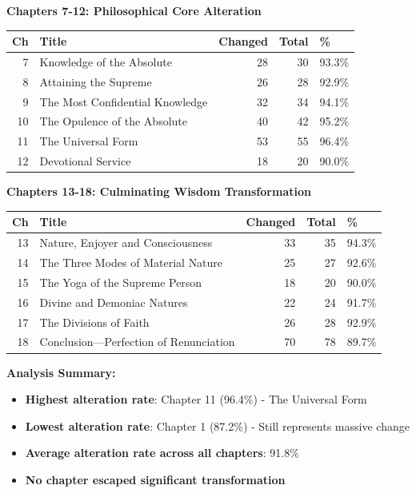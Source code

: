 \documentclass[11pt,twoside]{book}
\begin{document}
\textbf{\textbf{Chapters 7-12: Philosophical Core Alteration}}

\small
\begin{center}
\begin{tabular}{rlrrl}
Ch & Title & Changed & Total & \%\\
\hline
7 & Knowledge of the Absolute & 28 & 30 & 93.3\%\\
8 & Attaining the Supreme & 26 & 28 & 92.9\%\\
9 & The Most Confidential Knowledge & 32 & 34 & 94.1\%\\
10 & The Opulence of the Absolute & 40 & 42 & 95.2\%\\
11 & The Universal Form & 53 & 55 & 96.4\%\\
12 & Devotional Service & 18 & 20 & 90.0\%\\
\end{tabular}
\end{center}

\textbf{\textbf{Chapters 13-18: Culminating Wisdom Transformation}}

\small
\begin{center}
\begin{tabular}{rlrrl}
Ch & Title & Changed & Total & \%\\
\hline
13 & Nature, Enjoyer and Consciousness & 33 & 35 & 94.3\%\\
14 & The Three Modes of Material Nature & 25 & 27 & 92.6\%\\
15 & The Yoga of the Supreme Person & 18 & 20 & 90.0\%\\
16 & Divine and Demoniac Natures & 22 & 24 & 91.7\%\\
17 & The Divisions of Faith & 26 & 28 & 92.9\%\\
18 & Conclusion—Perfection of Renunciation & 70 & 78 & 89.7\%\\
\end{tabular}
\end{center}

\normalsize

\textbf{\textbf{Analysis Summary:}}
\begin{itemize}
\item \textbf{\textbf{Highest alteration rate}}: Chapter 11 (96.4\%) - The Universal Form
\item \textbf{\textbf{Lowest alteration rate}}: Chapter 1 (87.2\%) - Still represents massive change
\item \textbf{\textbf{Average alteration rate across all chapters}}: 91.8\%
\item \textbf{\textbf{No chapter escaped significant transformation}}
\end{itemize}
\end{document}
